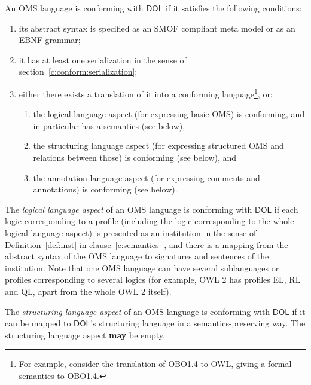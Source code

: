 \documentclass[10pt,fleqn,final]{scrreprt}
\newcommand*{\may}{\textbf{may}\xspace}
\newcommand*{\DOL}{\ensuremath{\mathsf{DOL}}\xspace}
\begin{document}
An OMS language is conforming with \DOL if it satisfies the following conditions:
\begin{enumerate}
\item its abstract syntax is specified as an SMOF compliant meta model
or as an EBNF grammar;
\item it has at least one serialization in the sense of section~\ref{c:conform:serialization};
\item either there exists a translation of it into a conforming
  language\footnote{For  example, consider the translation of OBO1.4
    to OWL, giving a formal semantics to OBO1.4.}, or:
\begin{enumerate}
\item the logical language aspect (for expressing basic OMS) is conforming, and in particular has a semantics (see below),
\item  the structuring language aspect (for expressing structured OMS and relations
between those) is conforming (see below), and
\item the annotation language aspect (for expressing comments and annotations)
is conforming (see below).
\end{enumerate}
\end{enumerate}


The \emph{logical language aspect} of an OMS language
is %
conforming with \DOL if each logic corresponding to a profile (including
the logic corresponding to the whole logical language aspect) is presented as an
institution  in the sense of Definition~\ref{def:inst} in clause~\ref{c:semantics} , and there is a mapping from
the abstract syntax of the OMS language to signatures and sentences
of the institution.
Note that one OMS language can have several sublanguages or profiles 
corresponding to several logics (for example, OWL 2 has profiles EL, RL and QL, apart from the
whole OWL 2 itself).


The \emph{structuring language aspect} of an OMS language is conforming with \DOL if it can be
mapped to \DOL's structuring language in a semantics-preserving way. The structuring language aspect
\may be empty.
\end{document}
